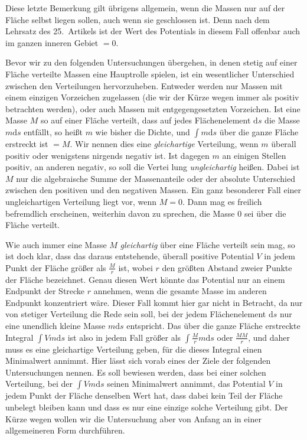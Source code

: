 Diese letzte Bemerkung gilt übrigens allgemein, wenn die Massen nur auf der Fläche selbst liegen sollen, auch wenn sie geschlossen ist. Denn nach dem Lehrsatz des 25.\ Artikels ist der Wert des Potentials in diesem Fall offenbar auch im ganzen inneren Gebiet $=0$.

Bevor wir zu den folgenden Untersuchungen übergehen, in denen stetig auf einer Fläche verteilte Massen eine Hauptrolle spielen, ist ein wesentlicher Unterschied zwischen den Verteilungen hervorzuheben. Entweder werden nur Massen mit einem einzigen Vorzeichen zugelassen (die wir der Kürze wegen immer als positiv betrachten werden), oder auch Massen mit entgegengesetzten Vorzeichen. Ist eine Masse $M$ so auf einer Fläche verteilt, dass auf jedes Flächenelement $\mathrm ds$ die Masse $m\mathrm ds$ entfällt, so heißt $m$ wie bisher die Dichte, und $\int m\mathrm ds$ über die ganze Fläche erstreckt ist $=M$. Wir nennen dies eine \textit{gleichartige} Verteilung, wenn $m$ überall positiv oder wenigstens nirgends negativ ist. Ist dagegen $m$ an einigen Stellen positiv, an anderen negativ, so soll die Vertei%
%
lung \textit{ungleichartig} heißen. Dabei ist $M$ nur die algebraische Summe der Massenanteile oder der absolute Unterschied zwischen den positiven und den negativen Massen. Ein ganz besonderer Fall einer ungleichartigen Verteilung liegt vor, wenn $M=0$. Dann mag es freilich befremdlich erscheinen, weiterhin davon zu sprechen, die Masse $0$ sei über die Fläche verteilt.

Wie auch immer eine Masse $M$ \textit{gleichartig} über eine Fläche verteilt sein mag, so ist doch klar, dass das daraus entstehende, überall positive Potential $V$ in jedem Punkt der Fläche größer als $\frac{M}{r}$ ist, wobei $r$ den größten Abstand zweier Punkte der Fläche bezeichnet. Genau diesen Wert könnte das Potential nur an einem Endpunkt der Strecke $r$ annehmen, wenn die gesamte Masse im anderen Endpunkt konzentriert wäre. Dieser Fall kommt hier gar nicht in Betracht, da nur von stetiger Verteilung die Rede sein soll, bei der jedem Flächenelement $\mathrm ds$ nur eine unendlich kleine Masse $m\mathrm ds$ entspricht. Das über die ganze Fläche erstreckte Integral $\int Vm\mathrm ds$ ist also in jedem Fall größer als $\int\frac{M}{r}m\mathrm ds$ oder $\frac{MM}{r}$, und daher muss es eine gleichartige Verteilung geben, für die dieses Integral einen Minimalwert annimmt. Hier lässt sich vorab eines der Ziele der folgenden Untersuchungen nennen. Es soll bewiesen werden, dass bei einer solchen Verteilung, bei der $\int Vm\mathrm ds$ seinen Minimalwert annimmt, das Potential $V$ in jedem Punkt der Fläche denselben Wert hat, dass dabei kein Teil der Fläche unbelegt bleiben kann und dass es nur eine einzige solche Verteilung gibt. Der Kürze wegen wollen wir die Untersuchung aber von Anfang an in einer allgemeineren Form durchführen.

